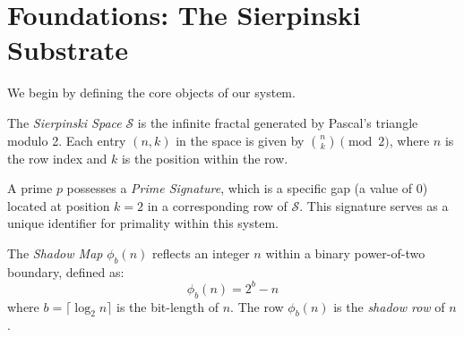 \section{Foundations: The Sierpinski Substrate}

We begin by defining the core objects of our system.

\begin{definition}
The \textit{Sierpinski Space} $\mathcal{S}$ is the infinite fractal generated by Pascal's triangle modulo 2. Each entry $(n, k)$ in the space is given by $\binom{n}{k} \pmod{2}$, where $n$ is the row index and $k$ is the position within the row.
\end{definition}

\begin{definition}
A prime $p$ possesses a \textit{Prime Signature}, which is a specific gap (a value of 0) located at position $k=2$ in a corresponding row of $\mathcal{S}$. This signature serves as a unique identifier for primality within this system.
\end{definition}

\begin{definition}
The \textit{Shadow Map} $\phi_b(n)$ reflects an integer $n$ within a binary power-of-two boundary, defined as:
\[
\phi_b(n) = 2^b - n
\]
where $b = \lceil \log_2 n \rceil$ is the bit-length of $n$. The row $\phi_b(n)$ is the \textit{shadow row} of $n$.
\end{definition}